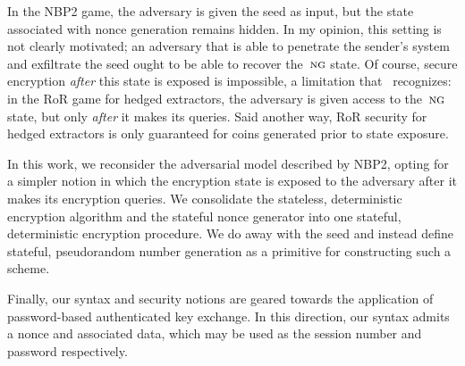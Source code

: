 %
In the NBP2 game, the adversary is given the seed as input, but the state
associated with nonce generation remains hidden. In my opinion, this setting is
not clearly motivated; an adversary that is able to penetrate the sender's
system and exfiltrate the seed ought to be able to recover the~$\textsc{ng}$ state.
%
Of course, secure encryption \emph{after} this state is exposed is impossible, a
limitation that~\cite{bellare2016nonce} recognizes: in the RoR game for hedged
extractors, the adversary is given access to the~$\textsc{ng}$ state, but only
\emph{after} it makes its queries. Said another way, RoR security for hedged
extractors is only guaranteed for coins generated prior to state exposure.

In this work, we reconsider the adversarial model described by NBP2, opting for
a simpler notion in which the encryption state is exposed to the adversary after
it makes its encryption queries.
%
We consolidate the stateless, deterministic encryption algorithm
and the stateful nonce generator into one stateful, deterministic encryption
procedure. We do away with the seed and instead define stateful, pseudorandom
number generation as a primitive for constructing such a scheme.

Finally, our syntax and security notions are geared towards the application of
password-based authenticated key exchange. In this direction, our syntax admits
a nonce and associated data, which may be used as the session number and
password respectively.

